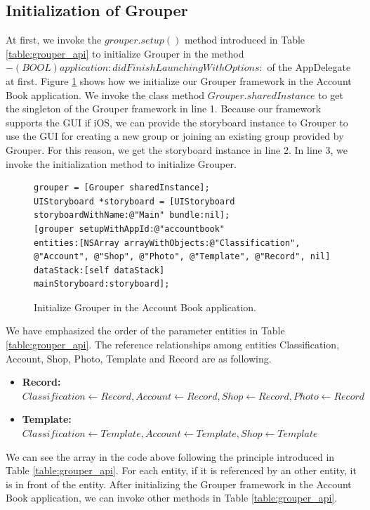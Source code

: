 \documentclass[a4paper,11pt]{report}
\begin{document}
\subsection{Initialization of Grouper}

At first, we invoke the $grouper.setup()$ method introduced in Table \ref{table:grouper_api} to initialize Grouper in the method $- (BOOL)application: didFinishLaunchingWithOptions:$ of the AppDelegate at first.
Figure \ref{fig:initialize_grouper} shows how we initialize our Grouper framework in the Account Book application.
We invoke the class method $Grouper.sharedInstance$ to get the singleton of the Grouper framework in line 1.
Because our framework supports the GUI if iOS, we can provide the storyboard instance to Grouper to use the GUI for creating a new group or joining an existing group provided by Grouper.
For this reason, we get the storyboard instance in line 2.
In line 3, we invoke the initialization method to initialize Grouper.

\begin{figure}
\begin{lstlisting}[frame=none language=Objective-C] 
grouper = [Grouper sharedInstance];
UIStoryboard *storyboard = [UIStoryboard storyboardWithName:@"Main" bundle:nil];
[grouper setupWithAppId:@"accountbook"
entities:[NSArray arrayWithObjects:@"Classification", @"Account", @"Shop", @"Photo", @"Template", @"Record", nil]
dataStack:[self dataStack]
mainStoryboard:storyboard];
\end{lstlisting}
\caption{Initialize Grouper in the Account Book application.}
\label{fig:initialize_grouper}
\end{figure}

We have emphasized the order of the parameter entities in Table \ref{table:grouper_api}.
The reference relationships among entities Classification, Account, Shop, Photo, Template and Record are as following.

\begin{itemize}[leftmargin=7mm]
	\setlength{\itemsep}{1pt}
	\setlength{\parskip}{0pt}
	\setlength{\parsep}{0pt}
	\item \textbf{Record:}
	$Classification \gets Record, Account \gets Record, Shop \gets Record, Photo \gets Record$
	\item \textbf{Template:} 
	$Classification \gets Template, Account \gets Template, Shop \gets Template$
\end{itemize}

We can see the array in the code above following the principle introduced in Table \ref{table:grouper_api}.
For each entity, if it is referenced by an other entity, it is in front of the entity.
After initializing the Grouper framework in the Account Book application, we can invoke other methods in Table \ref{table:grouper_api}.
\end{document}
